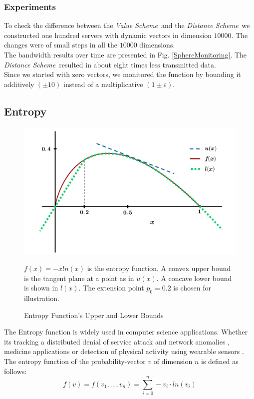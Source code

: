 \documentclass[10pt, conference]{IEEEtran}
\newcommand{\valueScheme}{\textit{Value Scheme}}
\newcommand{\distanceScheme}{\textit{Distance Scheme}}
\begin{document}
\subsubsection{Experiments}
To check the difference between the \valueScheme \ and the \distanceScheme \ we constructed one hundred servers with dynamic vectors in dimension $\num[group-separator={,}]{10000}$. The changes were of small steps in all the $\num[group-separator={,}]{10000}$ dimensions. \\
The bandwidth results over time are presented in Fig. \ref{SphereMonitoring}. The \distanceScheme \ resulted in about eight times less transmitted data. \\
Since we started with zero vectors, we monitored the function by bounding it additively ${(\pm 10)}$ instead of a multiplicative ${(1 \pm \varepsilon)}$.

\subsection{Entropy}
\begin{figure}[b]
\includegraphics[width=0.85\linewidth]{Pics/PNGs/EntropyBounds.png}
\caption{Entropy Function's Upper and Lower Bounds}
\label{EntropyBoundsFigure}
\medskip
\small
${f(x) = -xln(x)}$ is the entropy function. A convex upper bound is the tangent plane at a point as in $u(x)$. A concave lower bound is shown in $l(x)$. The extension point $p_0 = 0.2$ is chosen for illustration.
\end{figure}
The Entropy function is widely used in computer science applications. Whether its tracking a distributed denial of service attack and network anomalies \cite{arackaparambil2010distributed}, medicine applications \cite{anderson2004entropy} or detection of physical activity using wearable sensors \cite{ermes2008detection}. \\
The entropy function of the probability-vector $v$ of dimension $n$ is defined as follows:
\begin{equation}
f(v) = f(v_1,...,v_n)=\sum\limits_{i=0}^n -v_i \cdot ln(v_i)
\end{equation}
\end{document}
